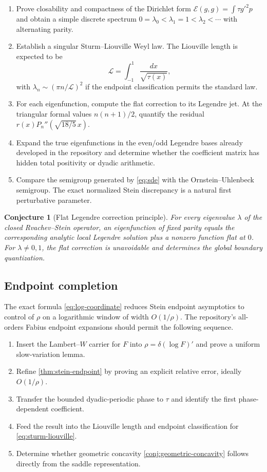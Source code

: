 \documentclass[11pt,oneside]{article}
\newtheorem{conjecture}[theorem]{Conjecture}
\theoremstyle{definition}
\theoremstyle{remark}
\begin{document}
\begin{enumerate}
\item Prove closability and compactness of the Dirichlet form
$\mathcal E(g,g)=\int\tau g'^2p$ and obtain a simple discrete spectrum
$0=\lambda_0<\lambda_1=1<\lambda_2<\cdots$ with alternating parity.
\item Establish a singular Sturm--Liouville Weyl law.  The Liouville length is
expected to be
\[
 \mathscr L=\int_{-1}^1\frac{dx}{\sqrt{\tau(x)}},
\]
with $\lambda_n\sim(\pi n/\mathscr L)^2$ if the endpoint classification permits
the standard law.
\item For each eigenfunction, compute the flat correction to its Legendre jet.
At the triangular formal values $n(n+1)/2$, quantify the residual
$r(x)P_n''(\sqrt{18/5}\,x)$.
\item Expand the true eigenfunctions in the even/odd Legendre bases already
developed in the repository and determine whether the coefficient matrix has
hidden total positivity or dyadic arithmetic.
\item Compare the semigroup generated by \eqref{eq:sde} with the Ornstein--Uhlenbeck
semigroup.  The exact normalized Stein discrepancy is a natural first perturbative
parameter.
\end{enumerate}

\begin{conjecture}[Flat Legendre correction principle]
For every eigenvalue $\lambda$ of the closed Rvachev--Stein operator, an
eigenfunction of fixed parity equals the corresponding analytic local Legendre
solution plus a nonzero function flat at $0$.  For $\lambda\ne0,1$, the flat
correction is unavoidable and determines the global boundary quantization.
\end{conjecture}

\subsection{Endpoint completion}
The exact formula \eqref{eq:log-coordinate} reduces Stein endpoint asymptotics to
control of $\rho$ on a logarithmic window of width $O(1/\rho)$.  The repository's
all-orders Fabius endpoint expansions should permit the following sequence.

\begin{enumerate}
\item Insert the Lambert--$W$ carrier for $F$ into
$\rho=\delta(\log F)'$ and prove a uniform slow-variation lemma.
\item Refine \cref{thm:stein-endpoint} by proving an explicit relative error,
ideally $O(1/\rho)$.
\item Transfer the bounded dyadic-periodic phase to $\tau$ and identify the first
phase-dependent coefficient.
\item Feed the result into the Liouville length and endpoint classification for
\eqref{eq:sturm-liouville}.
\item Determine whether geometric concavity
\cref{conj:geometric-concavity} follows directly from the saddle representation.
\end{enumerate}
\end{document}
